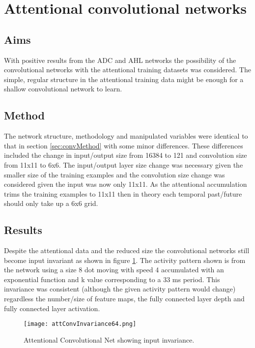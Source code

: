 \section{Attentional convolutional networks}
\subsection{Aims}
With positive results from the ADC and AHL networks the possibility of the convolutional networks with the attentional training datasets was considered. 
The simple, regular structure in the attentional training data might be enough for a shallow convolutional network to learn. 

\subsection{Method}
The network structure, methodology and manipulated variables were identical to that in section \ref{sec:convMethod} with some minor differences.
These differences included the change in input/output size from 16384 to 121 and convolution size from 11x11 to 6x6. 
The input/output layer size change was necessary given the smaller size of the training examples and the convolution size change was considered given the input was now only 11x11.
As the attentional accumulation trims the training examples to 11x11 then in theory each temporal past/future should only take up a 6x6 grid. 

\subsection{Results}
Despite the attentional data and the reduced size the convolutional networks still become input invariant as shown in figure \ref{fig:CAInvariant}.
The activity pattern shown is from the network using a size 8 dot moving with speed 4 accumulated with an exponential function and k value corresponding to a 33 ms period.
This invariance was consistent (although the given activity pattern would change) regardless the number/size of feature maps, the fully connected layer depth and fully connected layer activation.

\begin{figure}[h]
    \centering
    \texttt{[image: attConvInvariance64.png]}
    \caption{Attentional Convolutional Net showing input invariance.}
    \label{fig:CAInvariant}
\end{figure}

